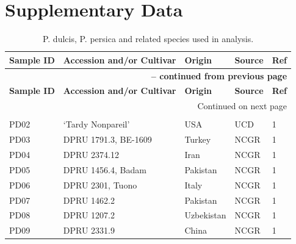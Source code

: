 \documentclass[12pt]{article}
\begin{document}
\section*{Supplementary Data}
\begin{center}
\begin{longtable}{lllll}
\caption{P. dulcis, P. persica and related species used in analysis.} \label{sampledetails} \\
\hline \hline \multicolumn{1}{l}{\textbf{Sample ID}} &
\multicolumn{1}{l}{\textbf{Accession and/or Cultivar}} &
\multicolumn{1}{l}{\textbf{Origin}} &
\multicolumn{1}{l}{\textbf{Source}} &
\multicolumn{1}{c}{\textbf{Ref}}\\ \hline 
\endfirsthead

\multicolumn{5}{r}{{\bfseries \tablename\ \thetable{} -- continued from previous page}} \\
\hline \multicolumn{1}{l}{\textbf{Sample ID}} &
\multicolumn{1}{l}{\textbf{Accession and/or Cultivar}} &
\multicolumn{1}{l}{\textbf{Origin}} &
\multicolumn{1}{l}{\textbf{Source}} &
\multicolumn{1}{c}{\textbf{Ref}} \\ \hline 
\endhead
%
\hline \multicolumn{5}{r}{{Continued on next page}} \\ \hline \hline
\endfoot
%
\endlastfoot
%
	\multicolumn{5}{l}{\emph{P. dulcis}}  \\
	PD02 &‘Tardy Nonpareil’ &USA &UCD &1\\
	PD03 &DPRU 1791.3, BE-1609 &Turkey &NCGR &1\\
	PD04 &DPRU 2374.12 &Iran &NCGR &1\\
	PD05 &DPRU 1456.4, Badam &Pakistan &NCGR &1\\
	PD06 &DPRU 2301, Tuono &Italy &NCGR &1\\
	PD07 &DPRU 1462.2 &Pakistan &NCGR &1\\
	PD08 &DPRU 1207.2 &Uzbekistan &NCGR &1\\
	PD09 &DPRU 2331.9 &China &NCGR &1\\

\end{longtable}
\end{center}
\end{document}
